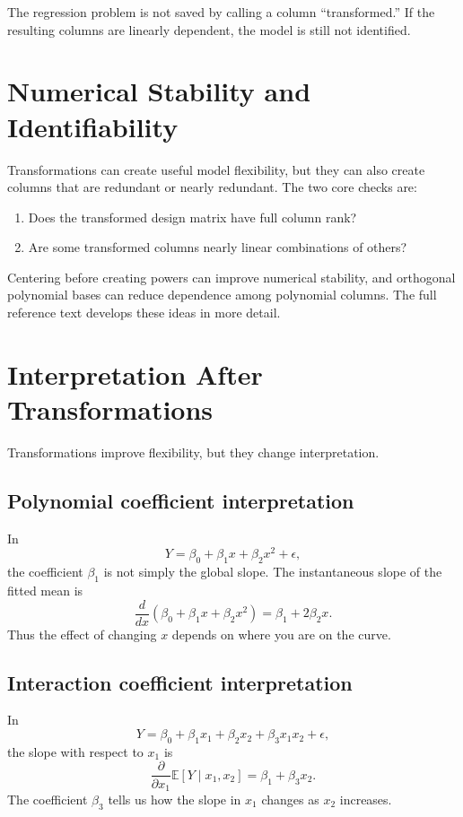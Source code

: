{The regression problem is not saved by calling a column ``transformed.''  If the resulting columns are linearly dependent, the model is still not identified.
}{
\section{Numerical Stability and Identifiability}

Transformations can create useful model flexibility, but they can also create columns that are redundant or nearly redundant.  The two core checks are:
\begin{enumerate}
  \item Does the transformed design matrix have full column rank?
  \item Are some transformed columns nearly linear combinations of others?
\end{enumerate}
Centering before creating powers can improve numerical stability, and orthogonal polynomial bases can reduce dependence among polynomial columns.  The full reference text develops these ideas in more detail.
}
\section{Interpretation After Transformations}

Transformations improve flexibility, but they change interpretation.

\subsection*{Polynomial coefficient interpretation}

In
\begin{equation}
  Y=\beta_0+\beta_1x+\beta_2x^2+\epsilon,
\end{equation}
the coefficient \(\beta_1\) is not simply the global slope.  The instantaneous slope of the fitted mean is
\begin{equation}
  \frac{d}{dx}\left(\beta_0+\beta_1x+\beta_2x^2\right)
  =\beta_1+2\beta_2x.
\end{equation}
Thus the effect of changing \(x\) depends on where you are on the curve.

\subsection*{Interaction coefficient interpretation}

In
\begin{equation}
  Y=\beta_0+\beta_1x_1+\beta_2x_2+\beta_3x_1x_2+\epsilon,
\end{equation}
the slope with respect to \(x_1\) is
\begin{equation}
  \frac{\partial}{\partial x_1}\mathbb{E}[Y\mid x_1,x_2]
  =\beta_1+\beta_3x_2.
\end{equation}
The coefficient \(\beta_3\) tells us how the slope in \(x_1\) changes as \(x_2\) increases.

